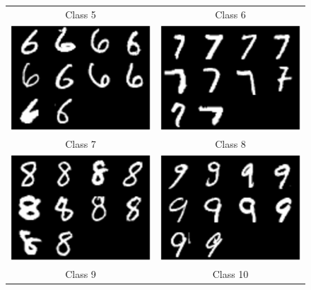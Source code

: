\documentclass{article}
\begin{document}
\begin{figure}[!htb]
\begin{tabular}{cc}
     Class 5 & Class 6 \\[6pt]
\includegraphics[width=55mm]{task1_1_imgs_class7.eps} &   \includegraphics[width=55mm]{task1_1_imgs_class8.eps} \\
     Class 7 & Class 8 \\[6pt]
\includegraphics[width=55mm]{task1_1_imgs_class9.eps} &   \includegraphics[width=55mm]{task1_1_imgs_class10.eps} \\
     Class 9 & Class 10 \\[6pt]
     
\end{tabular}

\end{figure}
\end{document}
